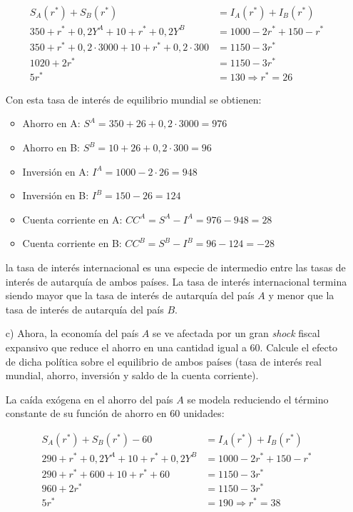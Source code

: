 \documentclass[a4paper]{article}
\begin{document}
\begin{itemize}
\begin{solution}
\begin{align*}
S_A(r^*) + S_B(r^*) &= I_A(r^*) + I_B(r^*) \\
350 + r^* + 0{,}2Y^A + 10 + r^* + 0{,}2Y^B &= 1000 - 2r^* + 150 - r^* \\
350 + r^* + 0{,}2 \cdot 3000 + 10 + r^* + 0{,}2 \cdot 300 &= 1150 - 3r^* \\
1020 + 2r^* &= 1150 - 3r^* \\
5r^* &= 130 \Rightarrow r^* = 26
\end{align*}

Con esta tasa de interés de equilibrio mundial se obtienen:

\begin{itemize}
    \item Ahorro en A: \( S^A = 350 + 26 + 0{,}2 \cdot 3000 = 976 \)
    \item Ahorro en B: \( S^B = 10 + 26 + 0{,}2 \cdot 300 = 96 \)
    \item Inversión en A: \( I^A = 1000 - 2 \cdot 26 = 948 \)
    \item Inversión en B: \( I^B = 150 - 26 = 124 \)
    \item Cuenta corriente en A: \( CC^A = S^A - I^A = 976 - 948 = 28 \)
    \item Cuenta corriente en B: \( CC^B = S^B - I^B = 96 - 124 = -28 \)
\end{itemize}
 la tasa de interés internacional es una especie de intermedio entre las tasas de interés de autarquía de ambos países. La tasa de interés internacional termina siendo mayor que la tasa de interés de autarquía del país $A$ y menor que la tasa de interés de autarquía del país $B$.
\end{solution}
    
    \item[c)] Ahora, la economía del país $A$ se ve afectada por un gran \textit{shock} fiscal expansivo que reduce el ahorro en una cantidad igual a 60. Calcule el efecto de dicha política sobre el equilibrio de ambos países (tasa de interés real mundial, ahorro, inversión y saldo de la cuenta corriente).
    \begin{solution}
La caída exógena en el ahorro del país $A$ se modela reduciendo el término constante de su función de ahorro en 60 unidades:

\begin{align*}
S_A(r^*) + S_B(r^*) - 60 &= I_A(r^*) + I_B(r^*) \\
290 + r^* + 0{,}2Y^A + 10 + r^* + 0{,}2Y^B &= 1000 - 2r^* + 150 - r^* \\
290 + r^* + 600 + 10 + r^* + 60 &= 1150 - 3r^* \\
960 + 2r^* &= 1150 - 3r^* \\
5r^* &= 190 \Rightarrow r^* = 38
\end{align*}


\end{solution}
\end{itemize}
\end{document}
